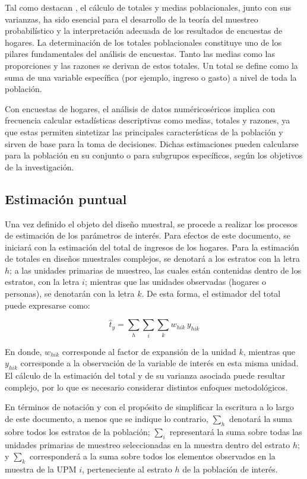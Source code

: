 \documentclass[
  spanish,
  12pt,
]{book}
\begin{document}
Tal como destacan \citet{heeringa2017applied}, el cálculo de totales y medias poblacionales, junto con sus varianzas, ha sido esencial para el desarrollo de la teoría del muestreo probabilístico y la interpretación adecuada de los resultados de encuestas de hogares. La determinación de los totales poblacionales constituye uno de los pilares fundamentales del análisis de encuestas. Tanto las medias como las proporciones y las razones se derivan de estos totales. Un total se define como la suma de una variable específica (por ejemplo, ingreso o gasto) a nivel de toda la población.

Con encuestas de hogares, el análisis de datos numéricoséricos implica con frecuencia calcular estadísticas descriptivas como medias, totales y razones, ya que estas permiten sintetizar las principales características de la población y sirven de base para la toma de decisiones. Dichas estimaciones pueden calcularse para la población en su conjunto o para subgrupos específicos, según los objetivos de la investigación.

\subsection{Estimación puntual}\label{estimacion-puntual}

Una vez definido el objeto del diseño muestral, se procede a realizar los procesos de estimación de los parámetros de interés. Para efectos de este documento, se iniciará con la estimación del total de ingresos de los hogares. Para la estimación de totales en diseños muestrales complejos, se denotará a los estratos con la letra \(h\); a las unidades primarias de muestreo, las cuales están contenidas dentro de los estratos, con la letra \(i\); mientras que las unidades observadas (hogares o personas), se denotarán con la letra \(k\). De esta forma, el estimador del total puede expresarse como:

\[
\hat{t}_y = \sum_{h} \sum_{i} \sum_{k} w_{hik} \, y_{hik}
\]

En donde, \(w_{hik}\) corresponde al factor de expansión de la unidad \(k\), mientras que \(y_{hik}\) corresponde a la observación de la variable de interés en esta misma unidad. El cálculo de la estimación del total y de su varianza asociada puede resultar complejo, por lo que es necesario considerar distintos enfoques metodológicos.

En términos de notación y con el propósito de simplificar la escritura a lo largo de este documento, a menos que se indique lo contrario, \(\sum_{h}\) denotará la suma sobre todos los estratos de la población; \(\sum_{i}\) representará la suma sobre todas las unidades primarias de muestreo seleccionadas en la muestra dentro del estrato \(h\); y \(\sum_{k}\) corresponderá a la suma sobre todos los elementos observados en la muestra de la UPM \(i\), perteneciente al estrato \(h\) de la población de interés.
\end{document}
